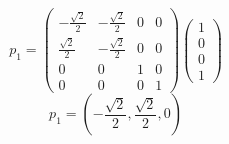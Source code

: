\documentclass[a4paper,12pt]{article}
\begin{document}
\begin{enumerate}
\begin{enumerate}
\begin{equation}
              p_1 = \begin{pmatrix}
              -\frac{\sqrt{2}}{2} & -\frac{\sqrt{2}}{2} & 0 & 0 \\
              \frac{\sqrt{2}}{2} & -\frac{\sqrt{2}}{2} & 0 & 0 \\
              0 & 0 & 1 & 0 \\
              0 & 0 & 0 & 1
              \end{pmatrix} 
              \begin{pmatrix}
              1 \\ 
              0 \\ 
              0 \\ 
              1
              \end{pmatrix}
              \end{equation}
              \begin{equation}
              \boxed{p_1 = (-\frac{\sqrt{2}}{2}, \frac{\sqrt{2}}{2}, 0)}
              \end{equation}
          \end{enumerate}


\end{enumerate}
\end{document}
